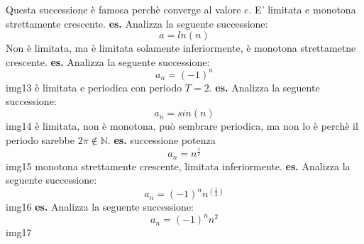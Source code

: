 Questa successione è famosa perchè converge al valore $e$. E' limitata e monotona strettamente crescente.
\newline
\newline
\textbf{es.} Analizza la seguente successione:
\[
    a = ln(n)
\]
Non è limitata, ma è limitata solamente inferiormente, è monotona strettametne crescente.
\newline
\newline
\textbf{es.} Analizza la seguente successione:
\[
    a_n = (-1)^n
\]
img13
\newline
è limitata e periodica con periodo $T=2$.
\newline
\newline
\textbf{es.} Analizza la seguente successione:
\[
    a_n = sin(n)
\]
img14
\newline
è limitata, non è monotona, può sembrare periodica, ma non lo è perchè il periodo sarebbe $2\pi \notin \mathbb{N}$.
\newline
\newline
\textbf{es.} successione potenza
\[
    a_n = n ^{\frac{1}{2}}
\]
img15
\newline
monotona strettamente crescente, limitata inferiormente.
\newline
\newline
\textbf{es.} Analizza la seguente successione:
\[
    a_n=(-1)^nn^{(\frac{1}{2})}
\]
img16
\newline
\newline
\textbf{es.} Analizza la seguente successione:
\[
    a_n=(-1)^nn^{2}
\]
img17
